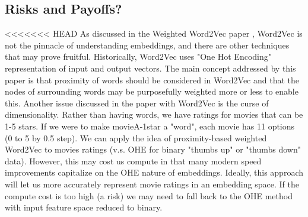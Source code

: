 \subsection{Risks and Payoffs?}

<<<<<<< HEAD
As discussed in the Weighted Word2Vec paper \cite{chang2017weighted}, Word2Vec is not the pinnacle of understanding embeddings, and there are other techniques that may prove fruitful. Historically, Word2Vec uses "One Hot Encoding" representation of input and output vectors. The main concept addressed by this paper is that proximity of words should be considered in Word2Vec and that the nodes of surrounding words may be purposefully weighted more or less to enable this. Another issue discussed in the paper with Word2Vec is the curse of dimensionality. Rather than having words, we have ratings for movies that can be 1-5 stars. If we were to make movieA-1star a "word", each movie has 11 options (0 to 5 by 0.5 step). We can apply the idea of proximity-based weighted Word2Vec to movies ratings (v.s. OHE for binary "thumbs up" or "thumbs down" data). However, this may cost us compute in that many modern speed improvements capitalize on the OHE nature of embeddings. Ideally, this approach will let us more accurately represent movie ratings in an embedding space. If the compute cost is too high (a risk) we may need to fall back to the OHE method with input feature space reduced to binary.

